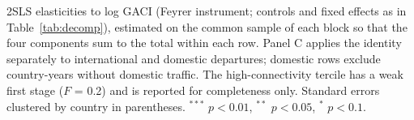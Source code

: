 \documentclass[12pt]{article}
\begin{document}
\begin{table}[H]
{\begin{threeparttable}
\begin{tablenotes}\scriptsize
\item 2SLS elasticities to log GACI (Feyrer instrument; controls and fixed effects as in Table~\ref{tab:decomp}), estimated on the common sample of each block so that the four components sum to the total within each row. Panel C applies the identity separately to international and domestic departures; domestic rows exclude country-years without domestic traffic. The high-connectivity tercile has a weak first stage ($F$ = 0.2) and is reported for completeness only. Standard errors clustered by country in parentheses. $^{***}$ $p<0.01$, $^{**}$ $p<0.05$, $^{*}$ $p<0.1$.
\end{tablenotes}
\end{threeparttable}}
\end{table}
\end{document}
